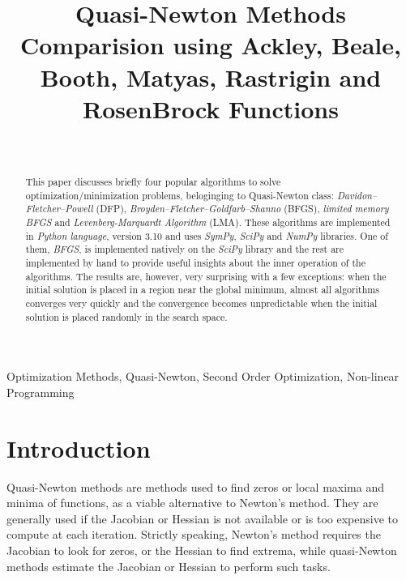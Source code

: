 \documentclass[conference]{IEEEtran}
\begin{document}
\title{Quasi-Newton Methods Comparision using Ackley, Beale, Booth, Matyas, Rastrigin and RosenBrock Functions}
\author{
	\\
}

\maketitle


\begin{abstract}
	This paper discusses briefly four popular algorithms to solve optimization/minimization problems, beloginging to Quasi-Newton class: \textit{Davidon–Fletcher–Powell} (DFP), \textit{Broyden–Fletcher–Goldfarb–Shanno} (BFGS), \textit{limited memory BFGS} and \textit{Levenberg-Marquardt Algorithm} (LMA). These algorithms are implemented in \textit{Python language}, version 3.10 and uses \textit{SymPy}, \textit{SciPy} and \textit{NumPy} libraries. One of them, \textit{BFGS}, is implemented natively on the  \textit{SciPy} library and the rest are implemented by hand to provide useful insights about the inner operation of the algorithms. The results are, however, very surprising with a few exceptions: when the initial solution is placed in a region near the global minimum, almost all algorithms converges very quickly and the convergence becomes unpredictable when the initial solution is placed randomly in the search space.
\end{abstract}

\begin{IEEEkeywords}
	Optimization Methods, Quasi-Newton, Second Order Optimization,  Non-linear Programming
\end{IEEEkeywords}

\section{Introduction}
\label{sec:introduction}

Quasi-Newton methods are methods used to find zeros or local maxima and minima of functions, as a viable alternative to Newton's method. They are generally used if the Jacobian or Hessian is not available or is too expensive to compute at each iteration. Strictly speaking, Newton's method requires the Jacobian to look for zeros, or the Hessian to find extrema, while quasi-Newton methods estimate the Jacobian or Hessian to perform such tasks.
\end{document}
